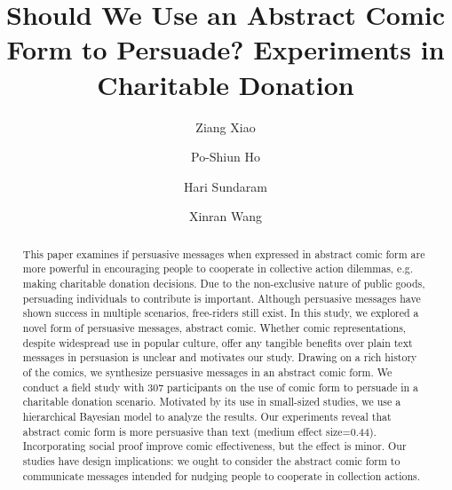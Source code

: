 \documentclass[format=acmsmall, natbib=false, review=false, authordraft=false, anonymous=true, screen=true]{acmart}
\begin{document}
\title[The Abstract Comic Form for Persuasion]{Should We Use an Abstract Comic Form to Persuade? Experiments in Charitable Donation}


\author{Ziang Xiao}
\author{Po-Shiun Ho}
\author{Hari Sundaram}
\author{Xinran Wang}




\begin{abstract}
This paper examines if persuasive messages when expressed in abstract comic form are more powerful in encouraging people to cooperate in collective action dilemmas, e.g. making charitable donation decisions. Due to the non-exclusive nature of public goods, persuading individuals to contribute is important. Although persuasive messages have shown success in multiple scenarios, free-riders still exist. In this study, we explored a novel form of persuasive messages, abstract comic. Whether comic representations, despite widespread use in popular culture, offer any tangible benefits over plain text messages in persuasion is unclear and motivates our study. Drawing on a rich history of the comics, we synthesize persuasive messages in an abstract comic form. We conduct a field study with 307 participants on the use of comic form to persuade in a charitable donation scenario. Motivated by its use in small-sized studies, we use a hierarchical Bayesian model to analyze the results. Our experiments reveal that abstract comic form is more persuasive than text (medium effect size=0.44). Incorporating social proof improve comic effectiveness, but the effect is minor. Our studies have design implications: we ought to consider the abstract comic form to communicate messages intended for nudging people to cooperate in collection actions.
\end{abstract}
\end{document}
